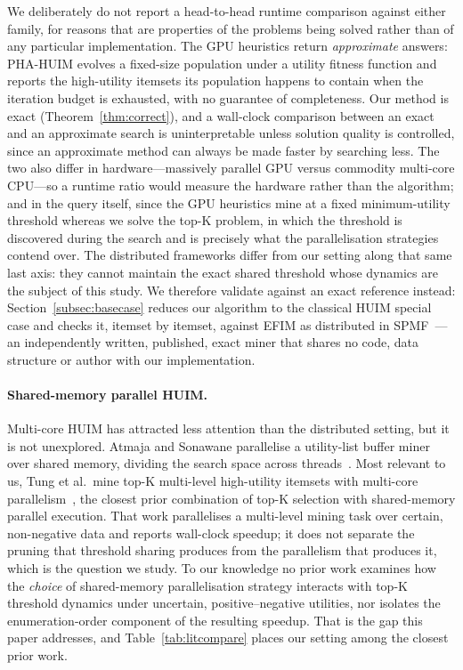 \documentclass[pdflatex,sn-vancouver-num]{sn-jnl}
\theoremstyle{thmstyleone}%
\theoremstyle{thmstyletwo}%
\theoremstyle{thmstylethree}%
\newcommand{\Kk}{\mathrm{K}}
\begin{document}
We deliberately do not report a head-to-head runtime comparison against
either family, for reasons that are properties of the problems being
solved rather than of any particular implementation. The GPU heuristics
return \emph{approximate} answers: PHA-HUIM evolves a fixed-size
population under a utility fitness function and reports the high-utility
itemsets its population happens to contain when the iteration budget is
exhausted, with no guarantee of completeness. Our method is exact
(Theorem~\ref{thm:correct}), and a wall-clock comparison between an
exact and an approximate search is uninterpretable unless solution
quality is controlled, since an approximate method can always be made
faster by searching less. The two also differ in hardware---massively
parallel GPU versus commodity multi-core CPU---so a runtime ratio would
measure the hardware rather than the algorithm; and in the query itself,
since the GPU heuristics mine at a fixed minimum-utility threshold
whereas we solve the top-$\Kk$ problem, in which the threshold is
discovered during the search and is precisely what the parallelisation
strategies contend over. The distributed frameworks differ from our
setting along that same last axis: they cannot maintain the exact shared
threshold whose dynamics are the subject of this study. We therefore
validate against an exact reference instead:
Section~\ref{subsec:basecase} reduces our algorithm to the classical
HUIM special case and checks it, itemset by itemset, against EFIM as
distributed in SPMF~\cite{fournierviger2014spmf,zida2017efim}---an
independently written, published, exact miner that shares no code, data
structure or author with our implementation.

\paragraph{Shared-memory parallel HUIM.}
Multi-core HUIM has attracted less attention than the distributed
setting, but it is not unexplored. Atmaja and Sonawane parallelise a utility-list buffer miner over shared memory, dividing the search space across threads~\cite{atmaja2023smplb}.
Most relevant to us, Tung et al.\ mine top-$\Kk$ multi-level high-utility
itemsets with multi-core parallelism~\cite{tung2026multicore}, the
closest prior combination of top-$\Kk$ selection with shared-memory
parallel execution. That work parallelises a multi-level mining
task over certain, non-negative data and reports wall-clock speedup;
it does not separate the pruning that threshold sharing produces
from the parallelism that produces it, which is the question we study.
To our knowledge no prior work examines how the \emph{choice} of
shared-memory parallelisation strategy interacts with top-$\Kk$
threshold dynamics under uncertain, positive--negative utilities, nor
isolates the enumeration-order component of the resulting speedup. That
is the gap this paper addresses, and Table~\ref{tab:litcompare} places
our setting among the closest prior work.
\end{document}
